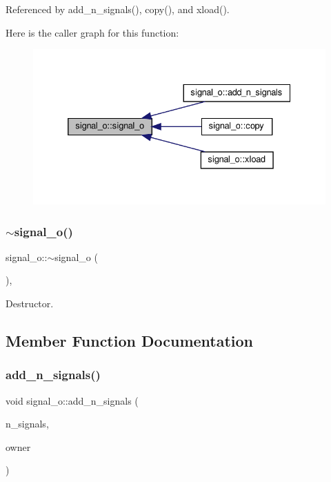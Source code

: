 Referenced by add\+\_\+n\+\_\+signals(), copy(), and xload().

Here is the caller graph for this function\+:
\nopagebreak
\begin{figure}[H]
\begin{center}
\leavevmode
\includegraphics[width=332pt]{db/d5c/classsignal__o_a3c1e51b33b28b50c084945f21878e104_icgraph}
\end{center}
\end{figure}
\mbox{\label{classsignal__o_a8aba12025f935a5b22de7a5a79e492c5}} 
\subsubsection{\texorpdfstring{$\sim$signal\+\_\+o()}{~signal\_o()}}
{\footnotesize\ttfamily signal\+\_\+o\+::$\sim$signal\+\_\+o (\begin{DoxyParamCaption}{ }\end{DoxyParamCaption})\hspace{0.3cm}{\ttfamily [override]}, {\ttfamily [default]}}



Destructor. 



\subsection{Member Function Documentation}
\mbox{\label{classsignal__o_ad5d3e5aa20af5d00401badcf9dcabbeb}} 
\subsubsection{\texorpdfstring{add\+\_\+n\+\_\+signals()}{add\_n\_signals()}}
{\footnotesize\ttfamily void signal\+\_\+o\+::add\+\_\+n\+\_\+signals (\begin{DoxyParamCaption}\item[{unsigned int}]{n\+\_\+signals,  }\item[{\hyperlink{structural__objects_8hpp_a8ea5f8cc50ab8f4c31e2751074ff60b2}{structural\+\_\+object\+Ref}}]{owner }\end{DoxyParamCaption})}



